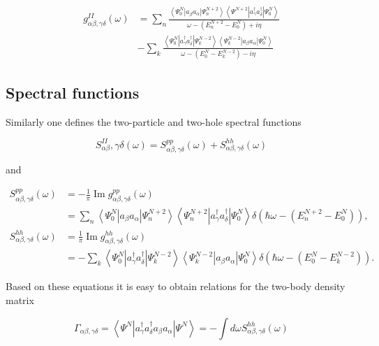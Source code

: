 {$$
\begin{aligned}
g_{\alpha \beta, \gamma \delta}^{I I}(\omega) & =\sum_{n} \frac{\left\langle\Psi_{0}^{N}\left|a_{\beta} a_{\alpha}\right| \Psi_{n}^{N+2}\right\rangle\left\langle\Psi^{N+2}\left|a_{\gamma}^{\dagger} a_{\delta}^{\dagger}\right| \Psi_{0}^{N}\right\rangle}{\omega-\left(E_{n}^{N+2}-E_{0}^{N}\right)+i \eta} \\
& -\sum_{k} \frac{\left\langle\Psi_{0}^{N}\left|a_{\gamma}^{\dagger} a_{\delta}^{\dagger}\right| \Psi_{k}^{N-2}\right\rangle\left\langle\Psi_{k}^{N-2}\left|a_{\beta} a_{\alpha}\right| \Psi_{0}^{N}\right\rangle}{\omega-\left(E_{0}^{N}-E_{k}^{N-2}\right)-i \eta}
\end{aligned}
$$

\subsection{Spectral functions}

Similarly one defines the two-particle and two-hole spectral functions

$$
S_{\alpha \beta}^{I I}, \gamma \delta(\omega)=S_{\alpha \beta, \gamma \delta}^{p p}(\omega)+S_{\alpha \beta, \gamma \delta}^{h h}(\omega)
$$

and

$$
\begin{aligned}
S_{\alpha \beta, \gamma \delta}^{p p}(\omega) & =-\frac{1}{\pi} \operatorname{Im} g_{\alpha \beta, \gamma \delta}^{p p}(\omega) \\
& =\sum_{n}\left\langle\Psi_{0}^{N}\left|a_{\beta} a_{\alpha}\right| \Psi_{n}^{N+2}\right\rangle\left\langle\Psi_{n}^{N+2}\left|a_{\gamma}^{\dagger} a_{\delta}^{\dagger}\right| \Psi_{0}^{N}\right\rangle \delta\left(\hbar \omega-\left(E_{n}^{N+2}-E_{0}^{N}\right)\right), \\
S_{\alpha \beta, \gamma \delta}^{h h}(\omega) & =\frac{1}{\pi} \operatorname{Im} g_{\alpha \beta, \gamma \delta}^{h h}(\omega) \\
& =-\sum_{k}\left\langle\Psi_{0}^{N}\left|a_{\gamma}^{\dagger} a_{\delta}^{\dagger}\right| \Psi_{k}^{N-2}\right\rangle\left\langle\Psi_{k}^{N-2}\left|a_{\beta} a_{\alpha}\right| \Psi_{0}^{N}\right\rangle \delta\left(\hbar \omega-\left(E_{0}^{N}-E_{k}^{N-2}\right)\right) .
\end{aligned}
$$

Based on these equations it is easy to obtain relations for the two-body density matrix

$$
\Gamma_{\alpha \beta, \gamma \delta}=\left\langle\Psi^{N}\left|a_{\gamma}^{\dagger} a_{\delta}^{\dagger} a_{\beta} a_{\alpha}\right| \Psi^{N}\right\rangle=-\int d \omega S_{\alpha \beta, \gamma \delta}^{h h}(\omega)
$$

}
